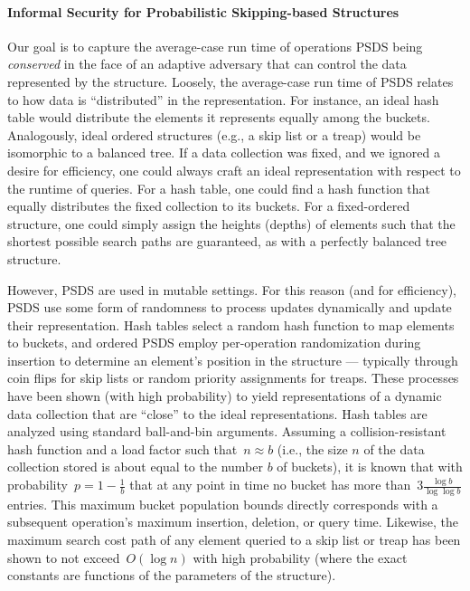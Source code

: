 \paragraph{Informal Security for Probabilistic Skipping-based  Structures}

Our goal is to capture the average-case run time of operations PSDS being \emph{conserved} in the face of an adaptive adversary that can control the data represented by the structure. Loosely, the average-case run time of PSDS relates to how data is ``distributed'' in the representation.  For instance, an ideal hash table would distribute the elements it represents equally among the buckets. Analogously, ideal ordered structures (e.g., a skip list or a treap) would be isomorphic to a balanced tree. If a data collection was fixed, and we ignored a desire for efficiency, one could always craft an ideal representation with respect to the runtime of queries. For a hash table, one could find a hash function that equally distributes the fixed collection to its buckets. For a fixed-ordered structure, one could simply assign the heights (depths) of elements such that the shortest possible search paths are guaranteed, as with a perfectly balanced tree structure. 

However, PSDS are used in mutable settings. For this reason (and for efficiency), PSDS use some form of randomness to process updates dynamically and update their representation. Hash tables select a random hash function to map elements to buckets, and ordered PSDS employ per-operation randomization during insertion to determine an element's position in the structure --- typically through coin flips for skip lists or random priority assignments for treaps. These processes have been shown (with high probability) to yield representations of a dynamic data collection that are ``close'' to the ideal representations. Hash tables are analyzed using standard ball-and-bin arguments. Assuming a collision-resistant hash function and a load factor such that~$n \approx b$ (i.e., the size $n$ of the data collection stored is about equal to the number $b$ of buckets), it is known \cite{chawla09} that with probability~$p = 1 - \frac{1}{b}$ that at any point in time no bucket has more than~$3\frac{\log b}{\log \log b}$ entries. This maximum bucket population bounds directly corresponds with a subsequent operation's maximum insertion, deletion, or query time. Likewise, the maximum search cost path of any element queried to a skip list or treap has been shown to not exceed~$O (\log n)$ with high probability (where the exact constants are functions of the parameters of the structure).  

